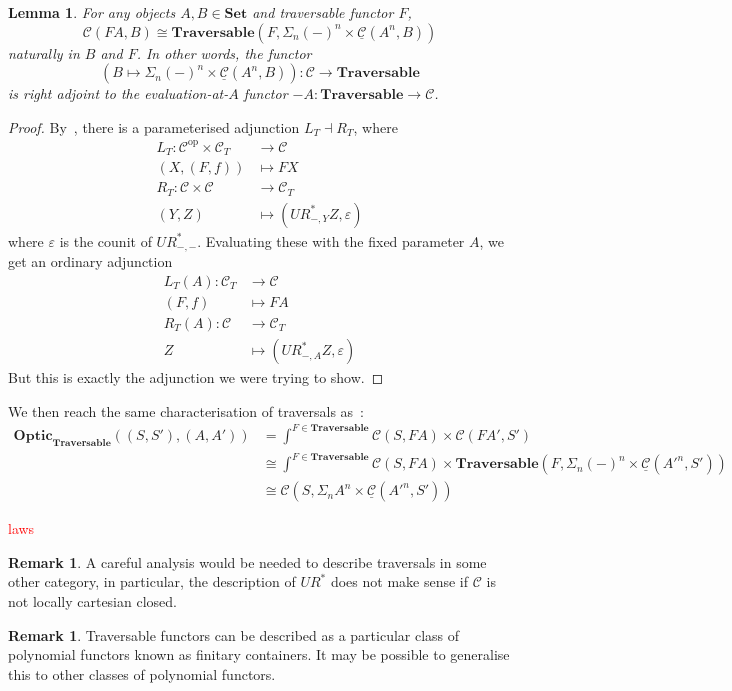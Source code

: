 \documentclass[11pt,a4paper]{article}
\theoremstyle{plain}
\newtheorem{lemma}[theorem]{Lemma}
\theoremstyle{definition}
\newtheorem{remark}[theorem]{Remark}
\newcommand{\C}{\mathscr{C}}
\newcommand{\homC}{\underline{\C}}
\newcommand{\Set}{\mathbf{Set}}
\newcommand{\Traversable}{\mathbf{Traversable}}
\newcommand{\Optic}{\mathbf{Optic}}
\newcommand{\op}{\mathrm{op}}
\newcommand{\todo}[1]{\textcolor{red}{\small #1}}
\begin{document}
\begin{lemma}
  For any objects $A, B \in \Set$ and traversable functor $F$, \[\C(FA, B) \cong \Traversable(F, \Sigma_n (-)^n \times \homC(A^n,B))\]
naturally in $B$ and $F$. In other words, the functor \[(B \mapsto \Sigma_n (-)^n \times \homC(A^n,B)) : \C \to \Traversable\] is right adjoint to the evaluation-at-$A$ functor $-A : \Traversable \to \C$.
\end{lemma}
\begin{proof}
By~\cite[Proposition 6]{AlgebrasForParameterisedMonads}, there is a parameterised adjunction $L_T \dashv R_T$, where
\begin{align*}
L_T : \C^\op \times \C_T &\to \C \\
(X, (F, f)) &\mapsto FX \\
R_T : \C \times \C &\to \C_T \\
(Y, Z) &\mapsto (UR^*_{-, Y} Z, \varepsilon)
\end{align*}
where $\varepsilon$ is the counit of $UR^*_{-, -}$. Evaluating these with the fixed parameter $A$, we get an ordinary adjunction 
\begin{align*}
L_T(A) : \C_T &\to \C \\
(F, f) &\mapsto FA \\
R_T(A) : \C &\to \C_T \\
Z &\mapsto (UR^*_{-, A} Z, \varepsilon)
\end{align*}
But this is exactly the adjunction we were trying to show.
\end{proof}

We then reach the same characterisation of traversals as~\cite{ProfunctorOptics}:
\begin{align*}
\Optic_\Traversable((S, S'), (A, A')) &= \int^{F \in \Traversable} \C(S, F A) \times \C(F A', S') \\
&\cong \int^{F \in \Traversable} \C(S, F A) \times \Traversable(F, \Sigma_n (-)^n \times \homC(A'^n,S')) \\
&\cong \C(S, \Sigma_n A^n \times \homC(A'^n,S'))
\end{align*}

\todo{laws}

\begin{remark}
A careful analysis would be needed to describe traversals in some other category, in particular, the description of $UR^*$ does not make sense if $\C$ is not locally cartesian closed.
\end{remark}

\begin{remark}
Traversable functors can be described as a particular class of polynomial functors known as finitary containers. It may be possible to generalise this to other classes of polynomial functors.
\end{remark}
\end{document}
